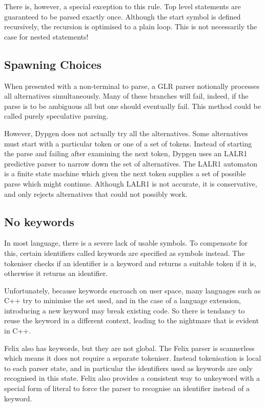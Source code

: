 \documentclass[oneside]{book}
\begin{document}
There is, however, a special exception to this rule.
Top level statements are guaranteed to be parsed exactly once.
Although the start symbol is defined recursively, the recursion
is optimised to a plain loop. This is not necessarily the 
case for nested statements!

\subsection{Spawning Choices}
When presented with a non-terminal to parse, a GLR parser
notionally processes all alternatives simultaneously.
Many of these branches will fail, indeed, if the parse
is to be ambiguous all but one should eventually fail.
This method could be called purely speculative parsing.

However, Dypgen does not actually try all the alternatives.
Some alternatives must start with a particular token
or one of a set of tokens. Instead of starting the parse
and failing after examining the next token, Dypgen
uses an LALR1 predictive parser to narrow down the
set of alternatives. The LALR1 automaton is a finite
state machine which given the next token supplies
a set of possible parse which might continue.
Although LALR1 is not accurate, it is conservative,
and only rejects alternatives that could not possibly
work.

\subsection{No keywords}
In most language, there is a severe lack of usable symbols.
To compensate for this, certain identifiers called keywords
are specified as symbols instead. The tokeniser checks if an
identifier is a keyword and returns a suitable token if it is,
otherwise it returns an identifier.

Unfortunately, because keywords encroach on user space,
many languages such as C++ try to minimise the set used,
and in the case of a language extension, introducing a new
keyword may break existing code. So there is tendancy to
reuse the keyword in a different context, leading to
the nightmare that is evident in C++.

Felix also has keywords, but they are not global.
The Felix parser is scannerless which means it does not
require a separate tokeniser. Instead tokenisation
is local to each parser state, and in particular
the identifiers used as keywords are only recognised
in this state. Felix also provides a consistent way
to unkeyword with a special form of literal to force
the parser to recognise an identifier instead of a keyword.
\end{document}

